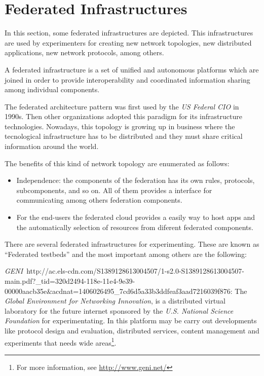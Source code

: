 \section{Federated Infrastructures}

In this section, some federated infrastructures are depicted. This
infrastructures are used by experimenters for creating new network topologies,
new distributed applications, new network protocols, among others.

A federated infrastructure is a set of unified and autonomous platforms which
are joined in order to provide interoperability and coordinated
information sharing among individual components. 

The federated architecture pattern was first used by the \emph{US Federal CIO} in
1990s. Then other organizations adopted this paradigm for its infrastructure
technologies. Nowadays, this topology is growing up in business where the
tecnological infrastructure has to be distributed and they must share critical
information around the world.

The benefits of this kind of network topology are enumerated as follows:
\begin{itemize}
\item Independence: the components of the federation has its own rules,
  protocols, subcomponents, and so on. All of them provides a interface for
  communicating among others federation components.
\item For the end-users the federated cloud provides a easily way to host apps
  and the automatically selection of resources from diferent federated components.
\end{itemize}

There are several federated infrastructures for experimenting. These are known
as ``Federated testbeds'' and the most important among others are the following:

\emph{GENI}~{http://ac.els-cdn.com/S1389128613004507/1-s2.0-S1389128613004507-main.pdf?\_tid=320d2494-118e-11e4-9e39-00000aacb35e\&acdnat=1406026495\_7cd6d5a33b3ddfeaf3aad7216039f876}:
The \emph{Global Environment for Networking Innovation}, is a distributed virtual
laboratory for the future internet sponsored by the \emph{U.S. National Science Foundation} for
experimentating. In this platform may be carry out developments like protocol
design and evaluation, distributed services, content management and experiments
that needs wide areas\footnote{For more information, see
  \url{http://www.geni.net/}}.

